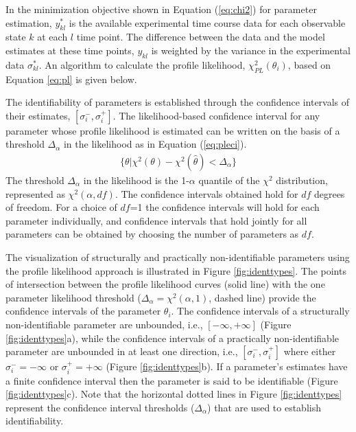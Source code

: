 \documentclass[10pt]{article}
\begin{document}
	 In the minimization objective shown in Equation (\ref{eq:chi2}) for parameter estimation, $y_{kl}^*$ is the available experimental time course data for each observable state $k$ at each $l$ time point. The difference between the data and the model estimates at these time points, $y_{kl}$ is weighted by the variance in the experimental data $\sigma_{kl}^*$. An algorithm to calculate the profile likelihood, $\chi_{PL}^2(\theta_i)$, based on Equation \ref{eq:pl} is given below.
	 
	 The identifiability of parameters is established through the confidence intervals of their estimates, $\left[\sigma_{i}^-,\sigma_{i}^+\right]$. The likelihood-based confidence interval for any parameter whose profile likelihood is estimated can be written on the basis of a threshold $\Delta_{\alpha}$ in the likelihood as in Equation (\ref{eq:pleci}).
	 \begin{align}\label{eq:pleci}
	 \{\theta|\chi^2(\theta)-\chi^2(\hat{\theta})<\Delta_{\alpha}\}
	 \end{align}
	 The threshold $\Delta_{\alpha}$ in the likelihood is the 1-$\alpha$ quantile of the $\chi^2$ distribution, represented as $\chi^2(\alpha,df)$. The confidence intervals obtained hold for $df$ degrees of freedom. For a choice of $df$=1 the confidence intervals will hold for each parameter individually, and confidence intervals that hold jointly for all parameters can be obtained by choosing the number of parameters as $df$. 
	
	The visualization of structurally and practically non-identifiable parameters using the profile likelihood approach is illustrated in Figure \ref{fig:identtypes}. The points of intersection between the profile likelihood curves (solid line) with the one parameter likelihood threshold ($\Delta_{\alpha} = \chi^2(\alpha,1)$, dashed line) provide the confidence intervals of the parameter $\theta_i$. The confidence intervals of a structurally non-identifiable parameter are unbounded, i.e., $\left[-\infty, +\infty\right]$ (Figure \ref{fig:identtypes}a), while the confidence intervals of a practically non-identifiable parameter are unbounded in at least one direction, i.e., $\left[\sigma_{i}^-,\sigma_{i}^+\right]$ where either $\sigma_{i}^- = -\infty$ or $\sigma_{i}^+ = +\infty$ (Figure \ref{fig:identtypes}b). If a parameter's estimates have a finite confidence interval then the parameter is said to be identifiable (Figure \ref{fig:identtypes}c). Note that the horizontal dotted lines in Figure \ref{fig:identtypes} represent the confidence interval thresholds ($\Delta_{\alpha}$) that are used to establish identifiability.
	
\end{document}
